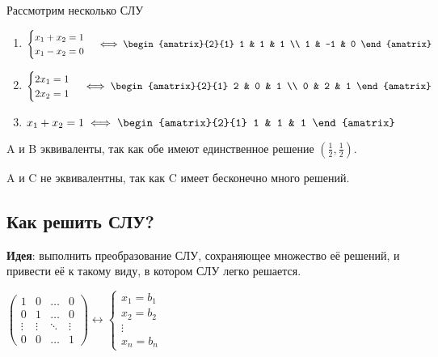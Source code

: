 \begin{example}
    Рассмотрим несколько СЛУ

    \begin{enumerate}[label=\Alph*)]
    \item
        $\begin{cases}
            x_1 + x_2 = 1 \\
            x_1 - x_2 = 0
        \end{cases} \iff \begin{amatrix}{2}{1}
            1 & 1 & 1 \\
            1 & -1 & 0
        \end{amatrix}$

    \item
        $\begin{cases}
            2x_1 = 1 \\
            2x_2 = 1
        \end{cases} \iff \begin{amatrix}{2}{1}
            2 & 0 & 1 \\
            0 & 2 & 1
        \end{amatrix}$

    \item
        $x_1 + x_2 = 1 \iff \begin{amatrix}{2}{1} 1 & 1 & 1 \end{amatrix}$
    \end{enumerate}

    A и B эквиваленты, так как обе имеют единственное решение $\left(\frac{1}{2}, \frac{1}{2}\right)$.
    
    A и C не эквивалентны, так как C имеет бесконечно много решений.
\end{example}

\subsection{Как решить СЛУ?}

\textbf{Идея}: выполнить преобразование СЛУ, сохраняющее множество её решений, и привести её к такому виду, в котором СЛУ легко решается.

\begin{example}
    $\begin{pmatrix}
        1 & 0 & \dots & 0 \\
        0 & 1 & \dots & 0 \\
        \vdots & \vdots & \ddots & \vdots \\
        0 & 0 & \dots & 1
    \end{pmatrix} \leftrightarrow \begin{cases}
        x_1 = b_1 \\
        x_2 = b_2 \\ 
        \vdots \\ 
        x_n = b_n
    \end{cases}$
\end{example}


